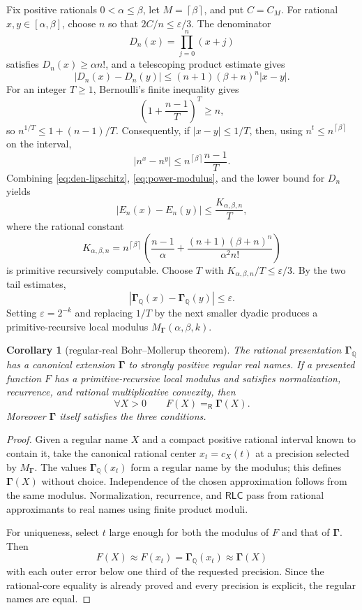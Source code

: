 \documentclass[11pt]{article}
\newtheorem{corollary}[theorem]{Corollary}
\newcommand{\Q}{\mathbb Q}
\newcommand{\Gam}{\boldsymbol\Gamma}
\newcommand{\Eq}{\mathrel{=_{\!\mathsf R}}}
\newcommand{\RLC}{\mathsf{RLC}}
\newcommand{\ceil}[1]{\left\lceil #1\right\rceil}
\newcommand{\abs}[1]{\left|#1\right|}
\begin{document}
Fix positive rationals $0<\alpha\le\beta$, let
$M=\ceil{\beta}$, and put $C=C_M$.  For rational
$x,y\in[\alpha,\beta]$, choose $n$ so that $2C/n\le\varepsilon/3$.
The denominator
\[
 D_n(x)=\prod_{j=0}^{n}(x+j)
\]
satisfies $D_n(x)\ge\alpha n!$, and a telescoping product estimate gives
\begin{equation}
 \abs{D_n(x)-D_n(y)}
 \le(n+1)(\beta+n)^n\abs{x-y}.
 \label{eq:den-lipschitz}
\end{equation}
For an integer $T\ge1$, Bernoulli's finite inequality gives
\[
 \left(1+\frac{n-1}{T}\right)^T\ge n,
\]
so $n^{1/T}\le1+(n-1)/T$.  Consequently, if
$\abs{x-y}\le1/T$, then, using $n^t\le n^{\ceil\beta}$ on the interval,
\begin{equation}
 \abs{n^x-n^y}
 \le n^{\ceil\beta}\frac{n-1}{T}.
 \label{eq:power-modulus}
\end{equation}
Combining \eqref{eq:den-lipschitz}, \eqref{eq:power-modulus}, and the lower
bound for $D_n$ yields
\begin{equation}
 \abs{E_n(x)-E_n(y)}\le\frac{K_{\alpha,\beta,n}}{T},
 \label{eq:En-modulus}
\end{equation}
where the rational constant
\begin{equation}
 K_{\alpha,\beta,n}
 =n^{\ceil\beta}
 \left(
   \frac{n-1}{\alpha}
   +\frac{(n+1)(\beta+n)^n}{\alpha^2 n!}
 \right)
 \label{eq:Kconstant}
\end{equation}
is primitive recursively computable.  Choose $T$ with
$K_{\alpha,\beta,n}/T\le\varepsilon/3$.  By the two tail estimates,
\[
 \abs{\Gam_{\Q}(x)-\Gam_{\Q}(y)}\le\varepsilon.
\]
Setting $\varepsilon=2^{-k}$ and replacing $1/T$ by the next smaller dyadic
produces a primitive-recursive local modulus
$M_{\Gam}(\alpha,\beta,k)$.

\begin{corollary}[regular-real Bohr--Mollerup theorem]
The rational presentation $\Gam_{\Q}$ has a canonical extension $\Gam$ to
strongly positive regular real names.  If a presented function $F$ has a
primitive-recursive local modulus and satisfies normalization, recurrence, and
rational multiplicative convexity, then
\[
 \forall X>0\qquad F(X)\Eq\Gam(X).
\]
Moreover $\Gam$ itself satisfies the three conditions.
\end{corollary}

\begin{proof}
Given a regular name $X$ and a compact positive rational interval known to
contain it, take the canonical rational center $x_t=c_X(t)$ at a precision
selected by $M_{\Gam}$.  The values $\Gam_{\Q}(x_t)$ form a regular name by
the modulus; this defines $\Gam(X)$ without choice.  Independence of the
chosen approximation follows from the same modulus.  Normalization,
recurrence, and $\RLC$ pass from rational approximants to real names using
finite product moduli.

For uniqueness, select $t$ large enough for both the modulus of $F$ and that
of $\Gam$.  Then
\[
 F(X)\approx F(x_t)=\Gam_{\Q}(x_t)\approx\Gam(X)
\]
with each outer error below one third of the requested precision.  Since the
rational-core equality is already proved and every precision is explicit, the
regular names are equal.
\end{proof}
\end{document}
